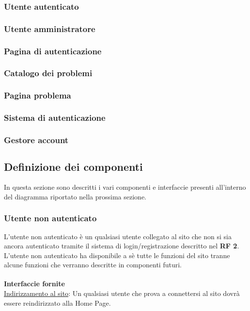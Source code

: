 \documentclass[11pt, a4paper]{article}
\theoremstyle{definition} %
\begin{document}
\subsubsection{Utente autenticato}
\subsubsection{Utente amministratore}
\subsubsection{Pagina di autenticazione}
\subsubsection{Catalogo dei problemi}
\subsubsection{Pagina problema}

\subsubsection{Sistema di autenticazione}
\subsubsection{Gestore account}


\newpage
\subsection{Definizione dei componenti}
In questa sezione sono descritti i vari componenti e interfaccie presenti all'interno del diagramma riportato nella prossima sezione.
\subsubsection{Utente non autenticato}
L'utente non autenticato è un qualsiasi utente collegato al sito che non si sia ancora autenticato tramite il sistema di login/registrazione descritto nel \textbf{RF 2}.\\
L'utente non autenticato ha disponibile a sè tutte le funzioni del sito tranne alcune funzioni che verranno descritte in componenti futuri.\\
\\
\textbf{Interfaccie fornite}\\
\underline{Indirizzamento al sito}: Un qualsiasi utente che prova a connettersi al sito dovrà essere reindirizzato alla Home Page.
\end{document}
